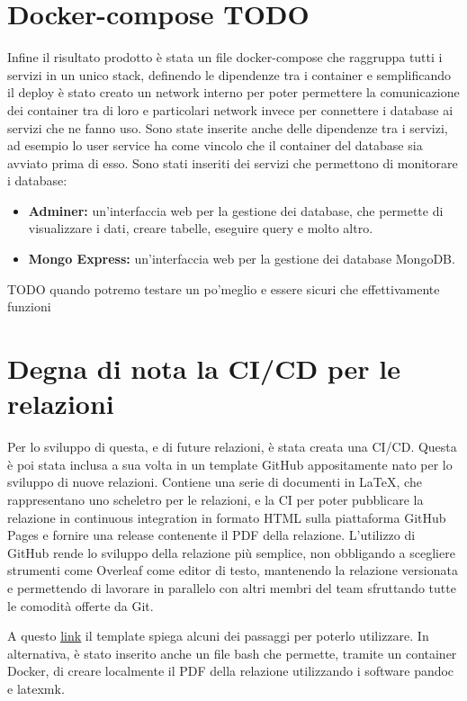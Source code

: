 \section{Docker-compose TODO}

Infine il risultato prodotto è stata un file docker-compose che raggruppa tutti i servizi in un unico stack, definendo le dipendenze tra i container e semplificando il deploy
è stato creato un network interno per poter permettere la comunicazione dei container tra di loro e particolari network invece per connettere i database ai servizi che ne fanno uso.
Sono state inserite anche delle dipendenze tra i servizi, ad esempio lo user service ha come vincolo che il container del database sia avviato prima di esso. 
\vspace{0.5cm}
Sono stati inseriti dei servizi che permettono di monitorare i database: 
\begin{itemize}
    \item \textbf{Adminer:} un'interfaccia web per la gestione dei database, che permette di visualizzare i dati, creare tabelle, eseguire query e molto altro.
    \item \textbf{Mongo Express:} un'interfaccia web per la gestione dei database MongoDB.
\end{itemize}

TODO quando potremo testare un po'meglio e essere sicuri che effettivamente funzioni

\section{Degna di nota la CI/CD per le relazioni}

Per lo sviluppo di questa, e di future relazioni, è stata creata una CI/CD. Questa è poi stata inclusa a sua volta in un template GitHub appositamente nato per lo sviluppo di nuove relazioni. Contiene una serie di documenti in LaTeX, che rappresentano uno scheletro per le relazioni, e la CI per poter pubblicare la relazione in continuous integration in formato HTML sulla piattaforma GitHub Pages e fornire una release contenente il PDF della relazione. L'utilizzo di GitHub rende lo sviluppo della relazione più semplice, non obbligando a scegliere strumenti come Overleaf come editor di testo, mantenendo la relazione versionata e permettendo di lavorare in parallelo con altri membri del team sfruttando tutte le comodità offerte da Git.

A questo \href{https://github.com/mega2799/Report-ghPages-latex}{\underline{link}} il template spiega alcuni dei passaggi per poterlo utilizzare. In alternativa, è stato inserito anche un file bash che permette, tramite un container Docker, di creare localmente il PDF della relazione utilizzando i software pandoc e latexmk.

